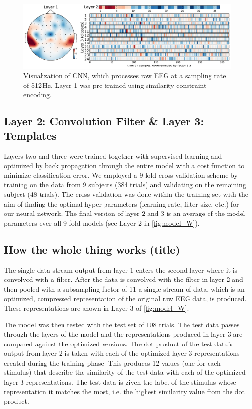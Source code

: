 \begin{figure}[h] 
  \begin{center}
    \includegraphics[width=\textwidth,keepaspectratio=true]{Figures/model_W}
    \caption{Visualization of \ac{CNN}, which processes raw EEG at a sampling rate of 512\,Hz.
    Layer 1 was pre-trained using similarity-constraint encoding.}
    \label{fig:model_W}
  \end{center}
\end{figure}

\subsection*{Layer 2: Convolution Filter \& Layer 3: Templates}
Layers two and three were trained together with supervised learning and optimized by back propagation through the entire model with a cost function to minimize classification error.
We employed a 9-fold cross validation scheme by training on the data from 9 subjects (384 trials) and validating on the remaining subject (48 trials).
The cross-validation was done within the training set with the aim of finding the optimal hyper-parameters (learning rate, filter size, etc.) for our neural network. 
The final version of layer 2 and 3 is an average of the model parameters over all 9 fold models (see Layer 2 in \autoref{fig:model_W}).

\subsection*{How the whole thing works (title)}
The single data stream output from layer 1 enters the second layer where it is convolved with a filter. 
After the data is convolved with the filter in layer 2 and then pooled with a subsampling factor of 11 a single stream of data, which is an optimized, compressed representation of the original raw EEG data, is produced.
These representations are shown in Layer 3 of \autoref{fig:model_W}. 

The model was then tested with the test set of 108 trials. 
The test data passes through the layers of the model and the representations produced in layer 3 are compared against the optimized versions. 
The dot product of the test data's output from layer 2 is taken with each of the optimized layer 3 representations created during the training phase. 
This produces 12 values (one for each stimulus) that describe the similarity of the test data with each of the optimized layer 3 representations. 
The test data is given the label of the stimulus whose representation it matches the most, i.e. the highest similarity value from the dot product. 